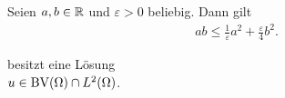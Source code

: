 \begin{lemma}
  \label{lem:young}
  Seien $a,b\in\mathbb{R}$ und $\varepsilon>0$ beliebig. Dann gilt
  \begin{align*}
    ab\leq\frac{1}{\varepsilon}a^2+\frac{\varepsilon}{4}b^2. 
  \end{align*}
\end{lemma}

\begin{theorem}
  \label{thm:contProblemExistence}
   besitzt eine Lösung \\$u\in\textup{BV}(\Omega)\cap
  L^2(\Omega)$.
\end{theorem}

